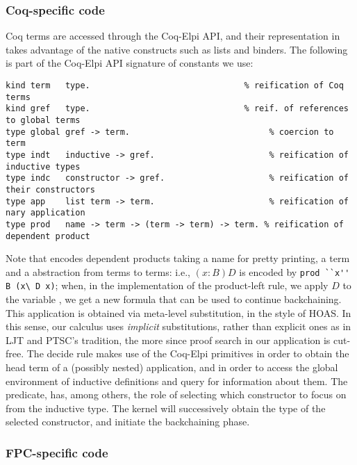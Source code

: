 \subsubsection{Coq-specific code}
Coq terms are accessed through the Coq-Elpi API, and their representation
in \lP takes advantage of the native \lP constructs such as lists and binders.
The following is part of the Coq-Elpi API signature of constants we use:
\begin{lstlisting}[language=lprolog]
kind term   type.                               % reification of Coq terms
kind gref   type.                               % reif. of references to global terms
type global gref -> term.                            % coercion to term
type indt   inductive -> gref.                       % reification of inductive types
type indc   constructor -> gref.                     % reification of their constructors 
type app    list term -> term.                       % reification of nary application
type prod   name -> term -> (term -> term) -> term. % reification of dependent product
\end{lstlisting}
%
Note that  encodes dependent products taking a name for pretty
printing, a term and a \lP abstraction from terms to terms: i.e., $(x :
B) D$ is encoded by \verb|prod ``x'' B (x\ D x)|; when, in the
implementation of the product-left rule, we apply $D$ to the variable
, we get a new formula that can be used to continue backchaining. This
application is obtained via meta-level substitution, in the style of HOAS. In
this sense, our calculus uses \emph{implicit} substitutions, rather than
explicit ones as in LJT and PTSC's tradition, the more since proof search in
our application is cut-free.
The decide rule makes use of the Coq-Elpi primitives
 in order to obtain the head term of a (possibly
nested) application, and  in order to access the global
environment of inductive definitions and query for information about them.
The  predicate,  has, among others, the role of selecting which
constructor to focus on from the inductive type. The kernel will successively
obtain the type of the selected constructor, and initiate the backchaining
phase.

\subsubsection{FPC-specific code}
\label{ssec:fpc}


